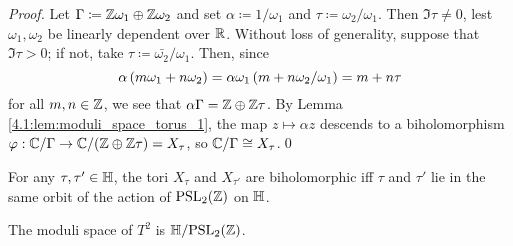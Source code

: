 \documentclass[../Moduli_Spaces_of_Riemann_Surfaces.tex]{subfiles}
\begin{document}
    \begin{proof}
        Let $\Gamma\coloneqq\mathbb{Z}\omega_1\oplus\mathbb{Z}\omega_2$ and set $\alpha\coloneqq1/\omega_1$ and $\tau\coloneqq\omega_2/\omega_1$. Then $\Im\tau\neq0$, lest $\omega_1,\omega_2$ be linearly dependent over $\mathbb{R}$. Without loss of generality, suppose that $\Im\tau>0$; if not, take $\tau\coloneqq\bar{\omega_2}/\omega_1$. Then, since
        \begin{equation*}
            \alpha\left(m\omega_1+n\omega_2\right)=\alpha\omega_1\left(m+n\omega_2/\omega_1\right)=m+n\tau
        \end{equation*}
        for all $m,n\in\mathbb{Z}$, we see that $\alpha\Gamma=\mathbb{Z}\oplus\mathbb{Z}\tau$. By Lemma \ref{4.1:lem:moduli_space_torus_1}, the map $z\mapsto\alpha z$ descends to a biholomorphism $\varphi:\mathbb{C}/\Gamma\to\mathbb{C}/\!\left(\mathbb{Z}\oplus\mathbb{Z}\tau\right)=X_\tau$, so $\mathbb{C}/\Gamma\cong X_\tau$.\qed
    \end{proof}
    \begin{theorem}
        For any $\tau,\tau'\in\mathbb{H}$, the tori $X_{\tau}$ and $X_{\tau'}$ are biholomorphic iff $\tau$ and $\tau'$ lie in the same orbit of the action of $\operatorname{PSL}_{2}\!\left(\mathbb{Z}\right)$ on $\mathbb{H}$.
    \end{theorem}
    \begin{corollary}
        The moduli space of $T^2$ is $\mathbb{H}/\!\operatorname{PSL}_{2}\!\left(\mathbb{Z}\right)$.
    \end{corollary}
\end{document}
